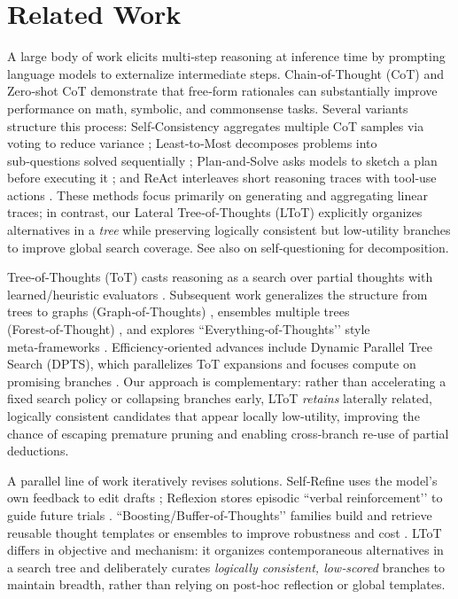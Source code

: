\documentclass{article}
\begin{document}
\section{Related Work}
\label{section:prior-work}

A large body of work elicits multi‑step reasoning at inference time by prompting language models to externalize intermediate steps. Chain‑of‑Thought (CoT) \citep{wei2022cot} and Zero‑shot CoT \citep{kojima2022zeroshotcot} demonstrate that free‑form rationales can substantially improve performance on math, symbolic, and commonsense tasks. Several variants structure this process: Self‑Consistency aggregates multiple CoT samples via voting to reduce variance \citep{wang2022selfconsistency}; Least‑to‑Most decomposes problems into sub‑questions solved sequentially \citep{zhou2022ltm}; Plan‑and‑Solve asks models to sketch a plan before executing it \citep{wang2023planandsolve}; and ReAct interleaves short reasoning traces with tool‑use actions \citep{yao2023react}. These methods focus primarily on generating and aggregating linear traces; in contrast, our Lateral Tree‑of‑Thoughts (LToT) explicitly organizes alternatives in a \emph{tree} while preserving logically consistent but low‑utility branches to improve global search coverage. See also \citet{press2022selfask} on self‑questioning for decomposition.

Tree‑of‑Thoughts (ToT) casts reasoning as a search over partial thoughts with learned/heuristic evaluators \citep{yao2023tot}. Subsequent work generalizes the structure from trees to graphs (Graph‑of‑Thoughts) \citep{besta2024got}, ensembles multiple trees (Forest‑of‑Thought) \citep{bi2024fot}, and explores “Everything‑of‑Thoughts’’ style meta‑frameworks \citep{ding2023xot}. Efficiency‑oriented advances include Dynamic Parallel Tree Search (DPTS), which parallelizes ToT expansions and focuses compute on promising branches \citep{ding2025dpts}. Our approach is complementary: rather than accelerating a fixed search policy or collapsing branches early, LToT \emph{retains} laterally related, logically consistent candidates that appear locally low‑utility, improving the chance of escaping premature pruning and enabling cross‑branch re‑use of partial deductions.

A parallel line of work iteratively revises solutions. Self‑Refine uses the model’s own feedback to edit drafts \citep{madaan2023selfrefine}; Reflexion stores episodic “verbal reinforcement’’ to guide future trials \citep{shinn2023reflexion}. “Boosting/Buffer‑of‑Thoughts’’ families build and retrieve reusable thought templates or ensembles to improve robustness and cost \citep{chen2024bot,yang2024bot}. LToT differs in objective and mechanism: it organizes contemporaneous alternatives in a search tree and deliberately curates \emph{logically consistent, low‑scored} branches to maintain breadth, rather than relying on post‑hoc reflection or global templates.
\end{document}
